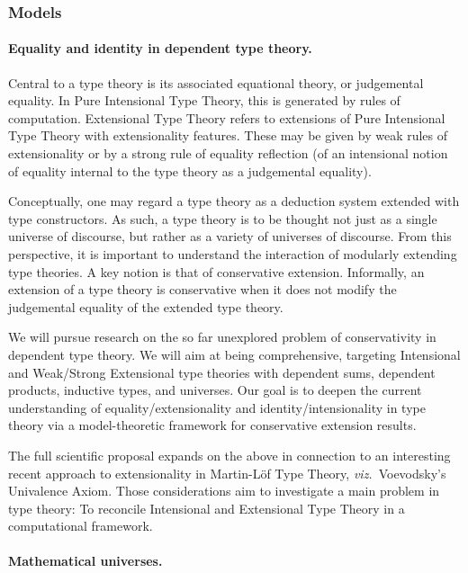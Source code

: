 \documentclass[11pt,twocolumn]{article}
\newcommand{\hl}[1]{#1}%
\newcommand{\viz}{\emph{viz.}}
\begin{document}
\subsubsection{Models}
\label{Models}

\paragraph{Equality and identity in dependent type theory.}
\label{IntensionalTypeTheoryParagraph}

Central to a type theory is its associated equational theory, or judgemental
equality.  In Pure Intensional Type Theory, this is generated by rules of
computation.  Extensional Type Theory refers to extensions of Pure Intensional
Type Theory with extensionality features.  These may be given by weak rules of
extensionality or by a strong rule of equality reflection (of an intensional
notion of equality internal to the type theory as a judgemental equality).  

Conceptually, one may regard a type theory as a deduction system extended with
type constructors.  As such, a type theory is to be thought not just as a
single universe of discourse, but rather as a variety of universes of
discourse.  From this perspective, it is important to understand the
interaction of modularly extending type theories.  A key notion is that of
conservative extension.  Informally, an extension of a type theory is
conservative when it does not modify the judgemental equality of the extended
type theory.

We will pursue \hl{research} on the so far unexplored problem of
conservativity in dependent type theory.  We will \hl{aim} at being
comprehensive, targeting Intensional and Weak/Strong Extensional type theories
with dependent sums, dependent products, inductive types, and universes.  Our
\hl{goal} is to deepen the current understanding of equality/extensionality
and identity/intensionality in type theory via a model-theoretic framework for
conservative extension results.  

The full scientific proposal expands on the above in connection to an
interesting recent approach to extensionality in Martin-L\"of Type Theory,
\viz~Voevodsky's Univalence Axiom. %
Those considerations \hl{aim} to investigate a main problem in type
theory: To reconcile Intensional and Extensional Type Theory in a
computational framework.

\paragraph{Mathematical universes.}
\label{MethodologyMathematicalUniversesParagraph}
\end{document}
